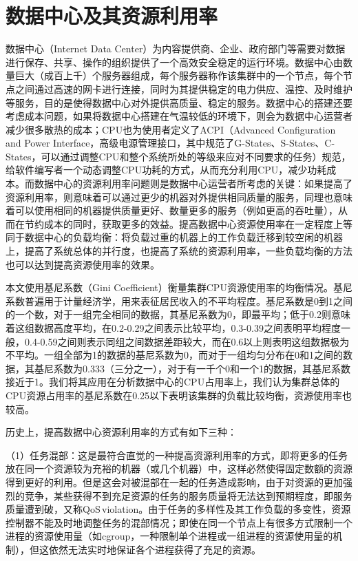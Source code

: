 \section{数据中心及其资源利用率}
数据中心（Internet Data Center）为内容提供商、企业、政府部门等需要对数据进行保存、共享、操作的组织提供了一个高效安全稳定的运行环境。数据中心由数量巨大（成百上千）个服务器组成，每个服务器称作该集群中的一个节点，每个节点之间通过高速的网卡进行连接，同时为其提供稳定的电力供应、温控、及时维护等服务，目的是使得数据中心对外提供高质量、稳定的服务。数据中心的搭建还要考虑成本问题，如果将数据中心搭建在气温较低的环境下，则会为数据中心运营者减少很多散热的成本；CPU也为使用者定义了ACPI（Advanced Configuration and Power Interface，高级电源管理接口，其中规范了G-States、S-States、C-States，可以通过调整CPU和整个系统所处的等级来应对不同要求的任务）规范，给软件编写者一个动态调整CPU功耗的方式，从而充分利用CPU，减少功耗成本。而数据中心的资源利用率问题则是数据中心运营者所考虑的关键：如果提高了资源利用率，则意味着可以通过更少的机器对外提供相同质量的服务，同理也意味着可以使用相同的机器提供质量更好、数量更多的服务（例如更高的吞吐量），从而在节约成本的同时，获取更多的效益。提高数据中心资源使用率在一定程度上等同于数据中心的负载均衡：将负载过重的机器上的工作负载迁移到较空闲的机器上，提高了系统总体的并行度，也提高了系统的资源利用率，一些负载均衡的方法也可以达到提高资源使用率的效果。

本文使用基尼系数（Gini Coefficient）\cite{gini}衡量集群CPU资源使用率的均衡情况。基尼系数普遍用于计量经济学，用来表征居民收入的不平均程度。基尼系数是0到1之间的一个数，对于一组完全相同的数据，其基尼系数为0，即最平均；低于0.2则意味着这组数据高度平均，在0.2-0.29之间表示比较平均，0.3-0.39之间表明平均程度一般，0.4-0.59之间则表示同组之间数据差距较大，而在0.6以上则表明这组数据极为不平均。一组全部为1的数据的基尼系数为0，而对于一组均匀分布在0和1之间的数据，其基尼系数为0.333（三分之一），对于有一千个0和一个1的数据，其基尼系数接近于1。我们将其应用在分析数据中心的CPU占用率上，我们认为集群总体的CPU资源占用率的基尼系数在0.25以下表明该集群的负载比较均衡，资源使用率也较高。

历史上，提高数据中心资源利用率的方式有如下三种：

（1）任务混部：这是最符合直觉的一种提高资源利用率的方式，即将更多的任务放在同一个资源较为充裕的机器（或几个机器）中，这样必然使得固定数额的资源得到更好的利用。但是这会对被混部在一起的任务造成影响，由于对资源的更加强烈的竞争，某些获得不到充足资源的任务的服务质量将无法达到预期程度，即服务质量遭到破，又称QoS\,violation。由于任务的多样性及其工作负载的多变性，资源控制器不能及时地调整任务的混部情况；即使在同一个节点上有很多方式限制一个进程的资源使用量（如cgroup，一种限制单个进程或一组进程的资源使用量的机制），但这依然无法实时地保证各个进程获得了充足的资源。

